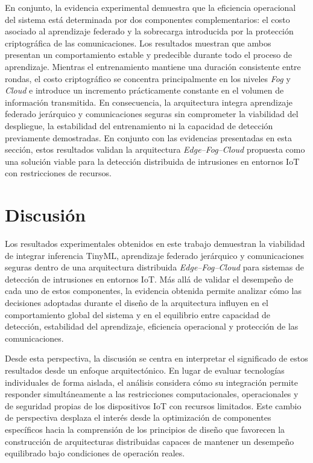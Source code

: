 \documentclass[journal,article,submit,moreauthors]{Definitions/mdpi}
\begin{document}
En conjunto, la evidencia experimental demuestra que la eficiencia operacional del sistema está determinada por dos componentes complementarios: el costo asociado al aprendizaje federado y la sobrecarga introducida por la protección criptográfica de las comunicaciones. Los resultados muestran que ambos presentan un comportamiento estable y predecible durante todo el proceso de aprendizaje. Mientras el entrenamiento mantiene una duración consistente entre rondas, el costo criptográfico se concentra principalmente en los niveles \textit{Fog} y \textit{Cloud} e introduce un incremento prácticamente constante en el volumen de información transmitida. En consecuencia, la arquitectura integra aprendizaje federado jerárquico y comunicaciones seguras sin comprometer la viabilidad del despliegue, la estabilidad del entrenamiento ni la capacidad de detección previamente demostradas. En conjunto con las evidencias presentadas en esta sección, estos resultados validan la arquitectura \textit{Edge--Fog--Cloud} propuesta como una solución viable para la detección distribuida de intrusiones en entornos IoT con restricciones de recursos.

\section{Discusión}

Los resultados experimentales obtenidos en este trabajo demuestran la viabilidad de integrar inferencia TinyML, aprendizaje federado jerárquico y comunicaciones seguras dentro de una arquitectura distribuida \textit{Edge--Fog--Cloud} para sistemas de detección de intrusiones en entornos IoT. Más allá de validar el desempeño de cada uno de estos componentes, la evidencia obtenida permite analizar cómo las decisiones adoptadas durante el diseño de la arquitectura influyen en el comportamiento global del sistema y en el equilibrio entre capacidad de detección, estabilidad del aprendizaje, eficiencia operacional y protección de las comunicaciones.

Desde esta perspectiva, la discusión se centra en interpretar el significado de estos resultados desde un enfoque arquitectónico. En lugar de evaluar tecnologías individuales de forma aislada, el análisis considera cómo su integración permite responder simultáneamente a las restricciones computacionales, operacionales y de seguridad propias de los dispositivos IoT con recursos limitados. Este cambio de perspectiva desplaza el interés desde la optimización de componentes específicos hacia la comprensión de los principios de diseño que favorecen la construcción de arquitecturas distribuidas capaces de mantener un desempeño equilibrado bajo condiciones de operación reales.
\end{document}

